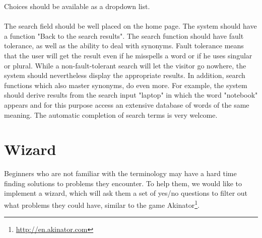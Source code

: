Choices should be available as a dropdown list.
\\\\
The search field should be well placed on the home page. 
The system should have a function "Back to the search results". 
The search function should have fault tolerance, as well as the ability to deal with synonyms. 
Fault tolerance means that the user will get the result even if he misspells a word or if he uses singular or plural. 
While a non-fault-tolerant search will let the visitor go nowhere, the system should nevertheless display the appropriate results.
In addition, search functions which also master synonyms, do even more. 
For example, the system should derive results from the search input "laptop" in which the word "notebook" appears and for this purpose access an extensive database of words of the same meaning. 
The automatic completion of search terms is very welcome.
  

\section{Wizard}
\label{wizard}
Beginners who are not familiar with the terminology may have a hard time finding solutions to problems they encounter. 
To help them, we would like to implement a wizard, which will ask them a set of yes/no questions to filter out what problems they could have, similar to the game Akinator\footnote{\url{http://en.akinator.com}}. 
 
